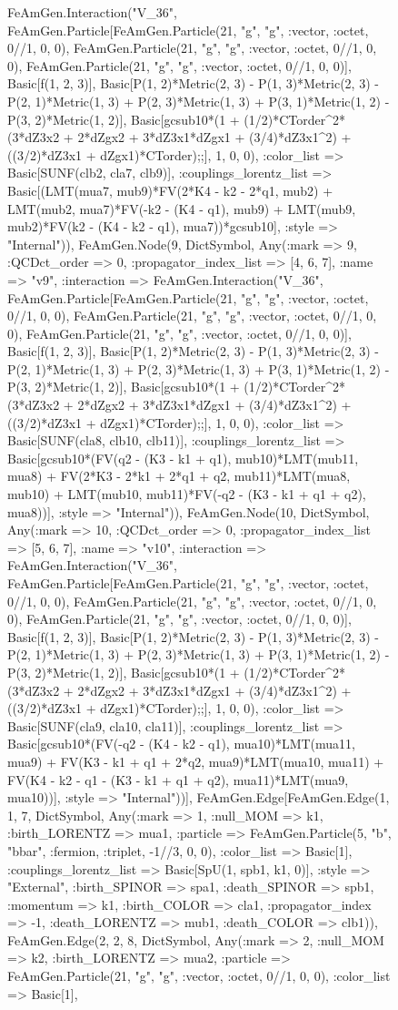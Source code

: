 \documentclass{revtex4}
\begin{document}
\begin{figure}[!htb]
\begin{center}
{FeAmGen.Interaction("V_36", FeAmGen.Particle[FeAmGen.Particle(21, "g", "g", :vector, :octet, 0//1, 0, 0), FeAmGen.Particle(21, "g", "g", :vector, :octet, 0//1, 0, 0), FeAmGen.Particle(21, "g", "g", :vector, :octet, 0//1, 0, 0)], Basic[f(1, 2, 3)], Basic[P(1, 2)*Metric(2, 3) - P(1, 3)*Metric(2, 3) - P(2, 1)*Metric(1, 3) + P(2, 3)*Metric(1, 3) + P(3, 1)*Metric(1, 2) - P(3, 2)*Metric(1, 2)], Basic[gcsub10*(1 + (1/2)*CTorder^2*(3*dZ3x2 + 2*dZgx2 + 3*dZ3x1*dZgx1 + (3/4)*dZ3x1^2) + ((3/2)*dZ3x1 + dZgx1)*CTorder);;], 1, 0, 0), :color_list => Basic[SUNF(clb2, cla7, clb9)], :couplings_lorentz_list => Basic[(LMT(mua7, mub9)*FV(2*K4 - k2 - 2*q1, mub2) + LMT(mub2, mua7)*FV(-k2 - (K4 - q1), mub9) + LMT(mub9, mub2)*FV(k2 - (K4 - k2 - q1), mua7))*gcsub10], :style => "Internal")), FeAmGen.Node(9, Dict{Symbol, Any}(:mark => 9, :QCDct_order => 0, :propagator_index_list => [4, 6, 7], :name => "v9", :interaction => FeAmGen.Interaction("V_36", FeAmGen.Particle[FeAmGen.Particle(21, "g", "g", :vector, :octet, 0//1, 0, 0), FeAmGen.Particle(21, "g", "g", :vector, :octet, 0//1, 0, 0), FeAmGen.Particle(21, "g", "g", :vector, :octet, 0//1, 0, 0)], Basic[f(1, 2, 3)], Basic[P(1, 2)*Metric(2, 3) - P(1, 3)*Metric(2, 3) - P(2, 1)*Metric(1, 3) + P(2, 3)*Metric(1, 3) + P(3, 1)*Metric(1, 2) - P(3, 2)*Metric(1, 2)], Basic[gcsub10*(1 + (1/2)*CTorder^2*(3*dZ3x2 + 2*dZgx2 + 3*dZ3x1*dZgx1 + (3/4)*dZ3x1^2) + ((3/2)*dZ3x1 + dZgx1)*CTorder);;], 1, 0, 0), :color_list => Basic[SUNF(cla8, clb10, clb11)], :couplings_lorentz_list => Basic[gcsub10*(FV(q2 - (K3 - k1 + q1), mub10)*LMT(mub11, mua8) + FV(2*K3 - 2*k1 + 2*q1 + q2, mub11)*LMT(mua8, mub10) + LMT(mub10, mub11)*FV(-q2 - (K3 - k1 + q1 + q2), mua8))], :style => "Internal")), FeAmGen.Node(10, Dict{Symbol, Any}(:mark => 10, :QCDct_order => 0, :propagator_index_list => [5, 6, 7], :name => "v10", :interaction => FeAmGen.Interaction("V_36", FeAmGen.Particle[FeAmGen.Particle(21, "g", "g", :vector, :octet, 0//1, 0, 0), FeAmGen.Particle(21, "g", "g", :vector, :octet, 0//1, 0, 0), FeAmGen.Particle(21, "g", "g", :vector, :octet, 0//1, 0, 0)], Basic[f(1, 2, 3)], Basic[P(1, 2)*Metric(2, 3) - P(1, 3)*Metric(2, 3) - P(2, 1)*Metric(1, 3) + P(2, 3)*Metric(1, 3) + P(3, 1)*Metric(1, 2) - P(3, 2)*Metric(1, 2)], Basic[gcsub10*(1 + (1/2)*CTorder^2*(3*dZ3x2 + 2*dZgx2 + 3*dZ3x1*dZgx1 + (3/4)*dZ3x1^2) + ((3/2)*dZ3x1 + dZgx1)*CTorder);;], 1, 0, 0), :color_list => Basic[SUNF(cla9, cla10, cla11)], :couplings_lorentz_list => Basic[gcsub10*(FV(-q2 - (K4 - k2 - q1), mua10)*LMT(mua11, mua9) + FV(K3 - k1 + q1 + 2*q2, mua9)*LMT(mua10, mua11) + FV(K4 - k2 - q1 - (K3 - k1 + q1 + q2), mua11)*LMT(mua9, mua10))], :style => "Internal"))], FeAmGen.Edge[FeAmGen.Edge(1, 1, 7, Dict{Symbol, Any}(:mark => 1, :null_MOM => k1, :birth_LORENTZ => mua1, :particle => FeAmGen.Particle(5, "b", "bbar", :fermion, :triplet, -1//3, 0, 0), :color_list => Basic[1], :couplings_lorentz_list => Basic[SpU(1, spb1, k1, 0)], :style => "External", :birth_SPINOR => spa1, :death_SPINOR => spb1, :momentum => k1, :birth_COLOR => cla1, :propagator_index => -1, :death_LORENTZ => mub1, :death_COLOR => clb1)), FeAmGen.Edge(2, 2, 8, Dict{Symbol, Any}(:mark => 2, :null_MOM => k2, :birth_LORENTZ => mua2, :particle => FeAmGen.Particle(21, "g", "g", :vector, :octet, 0//1, 0, 0), :color_list => Basic[1], }
\end{center}
\end{figure}
\end{document}
